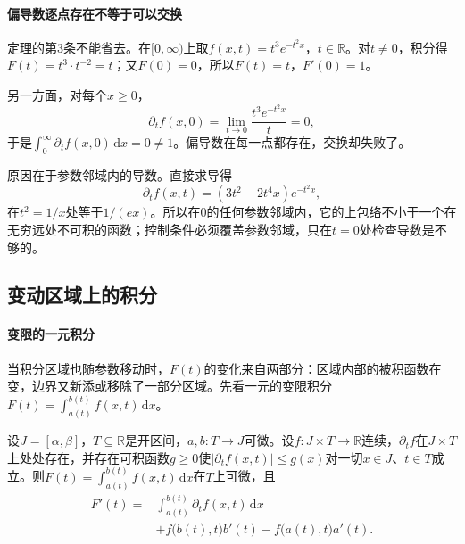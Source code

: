 \paragraph{偏导数逐点存在不等于可以交换}
定理的第3条不能省去。在$[0,\infty)$上取$f(x,t)=t^3e^{-t^2x}$，$t\in\mathbb R$。对$t\neq0$，积分得$F(t)=t^3\cdot t^{-2}=t$；又$F(0)=0$，所以$F(t)=t$，$F'(0)=1$。

另一方面，对每个$x\geq0$，
\[
 \partial_tf(x,0)=\lim_{t\to0}\frac{t^3e^{-t^2x}}t=0,
\]
于是$\int_0^\infty\partial_tf(x,0)\,\mathrm dx=0\neq1$。偏导数在每一点都存在，交换却失败了。

原因在于参数邻域内的导数。直接求导得
\[
 \partial_tf(x,t)=(3t^2-2t^4x)e^{-t^2x},
\]
在$t^2=1/x$处等于$1/(ex)$。所以在$0$的任何参数邻域内，它的上包络不小于一个在无穷远处不可积的函数；控制条件必须覆盖参数邻域，只在$t=0$处检查导数是不够的。

\subsection{变动区域上的积分}
\label{sec:integ-moving-domain}

\paragraph{变限的一元积分}
当积分区域也随参数移动时，$F(t)$的变化来自两部分：区域内部的被积函数在变，边界又新添或移除了一部分区域。先看一元的变限积分$F(t)=\int_{a(t)}^{b(t)}f(x,t)\,\mathrm dx$。

\begin{theorem}[变限积分的求导]
\label{thm:integ-variable-limits}
设$J=[\alpha,\beta]$，$T\subseteq\mathbb R$是开区间，$a,b:T\to J$可微。设$f:J\times T\to\mathbb R$连续，$\partial_tf$在$J\times T$上处处存在，并存在可积函数$g\geq0$使$\lvert\partial_tf(x,t)\rvert\leq g(x)$对一切$x\in J$、$t\in T$成立。则$F(t)=\int_{a(t)}^{b(t)}f(x,t)\,\mathrm dx$在$T$上可微，且
\begin{equation}
\begin{aligned}
 F'(t)={}&\int_{a(t)}^{b(t)}\partial_tf(x,t)\,\mathrm dx\\
 &+f\bigl(b(t),t\bigr)b'(t)-f\bigl(a(t),t\bigr)a'(t).
\end{aligned}
 \label{eq:integ-variable-limits}
\end{equation}
\end{theorem}

